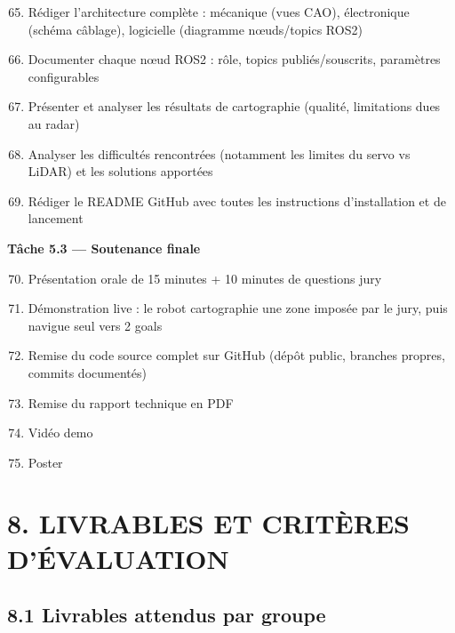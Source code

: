 \documentclass[12pt,a4paper]{article}
\begin{document}
\begin{enumerate}
  \setcounter{enumi}{64}
  \item Rédiger l'architecture complète : mécanique (vues CAO), électronique (schéma câblage), logicielle (diagramme nœuds/topics ROS2)
  \item Documenter chaque nœud ROS2 : rôle, topics publiés/souscrits, paramètres configurables
  \item Présenter et analyser les résultats de cartographie (qualité, limitations dues au radar)
  \item Analyser les difficultés rencontrées (notamment les limites du servo vs LiDAR) et les solutions apportées
  \item Rédiger le README GitHub avec toutes les instructions d'installation et de lancement
\end{enumerate}

\textbf{Tâche 5.3 — Soutenance finale}

\begin{enumerate}
  \setcounter{enumi}{69}
  \item Présentation orale de 15 minutes + 10 minutes de questions jury
  \item Démonstration live : le robot cartographie une zone imposée par le jury, puis navigue seul vers 2 goals
  \item Remise du code source complet sur GitHub (dépôt public, branches propres, commits documentés)
  \item Remise du rapport technique en PDF
  \item Vidéo demo
  \item Poster
\end{enumerate}

\section{8. LIVRABLES ET CRITÈRES D'ÉVALUATION}

\subsection{8.1 Livrables attendus par groupe}
\end{document}
